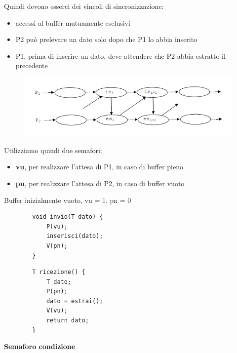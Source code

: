 \documentclass{article}
\begin{document}
Quindi devono esserci dei vincoli di sincronizzazione:
\begin{itemize}
    \item accessi al buffer mutuamente esclusivi
    \item P2 può prelevare un dato solo dopo che P1 lo abbia inserito
    \item P1, prima di inserire un dato, deve attendere che P2 abbia estratto il precedente
\end{itemize}

\begin{figure}[htbp]
    \centering
    \includegraphics[width=0.60\columnwidth]{imgs/vincoli_precendenza.PNG}
\end{figure}

\vspace{3mm}
Utilizziamo quindi due semafori:
\begin{itemize}
    \item \textbf{vu}, per realizzare l'attesa di P1, in caso di buffer pieno
    \item \textbf{pn}, per realizzare l'attesa di P2, in caso di buffer vuoto
\end{itemize}

\vspace{3mm}
Buffer inizialmente vuoto, vu = 1, pn = 0
\vspace{3mm}

\noindent\begin{minipage}{.45\columnwidth}
    \begin{lstlisting}
        void invio(T dato) {
            P(vu);
            inserisci(dato);
            V(pn);
        }
    \end{lstlisting}
\end{minipage}\hfill
\begin{minipage}{.45\columnwidth}
    \begin{lstlisting}
        T ricezione() {
            T dato;
            P(pn);
            dato = estrai();
            V(vu);
            return dato;
        }
    \end{lstlisting}
\end{minipage}

\vspace{5mm}
\textbf{Semaforo condizione}
\end{document}
